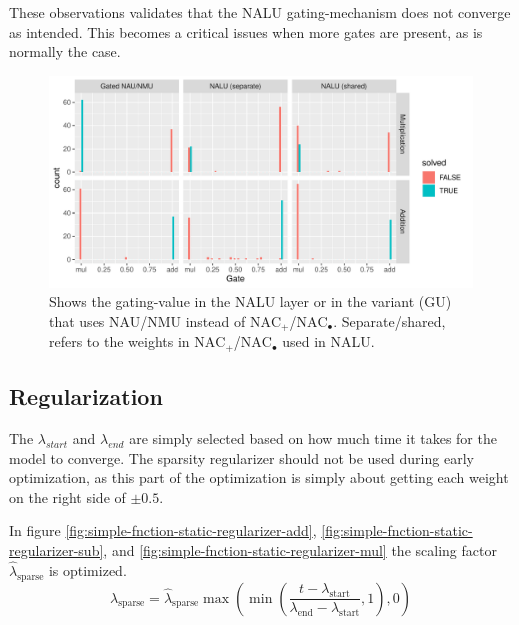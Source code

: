 These observations validates that the NALU gating-mechanism does not converge as intended. This becomes a critical issues when more gates are present, as is normally the case.

\begin{figure}[h]
\centering
\includegraphics[width=0.98\linewidth]{results/function_task_static_nalu.pdf}
\caption{Shows the gating-value in the NALU layer or in the variant (GU) that uses NAU/NMU instead of $\mathrm{NAC}_{+}$/$\mathrm{NAC}_{\bullet}$. Separate/shared, refers to the weights in $\mathrm{NAC}_{+}$/$\mathrm{NAC}_{\bullet}$ used in NALU.}
\label{fig:simple-function-static-nalu-gate-graph}
\end{figure}



\subsection{Regularization}
\label{sec:appendix:simple-function-task:regualization}

The $\lambda_{start}$ and $\lambda_{end}$ are simply selected based on how much time it takes for the model to converge. The sparsity regularizer should not be used during early optimization, as this part of the optimization is simply about getting each weight on the right side of $\pm 0.5$.

In figure \ref{fig:simple-fnction-static-regularizer-add}, \ref{fig:simple-fnction-static-regularizer-sub}, and \ref{fig:simple-fnction-static-regularizer-mul} the scaling factor $\hat{\lambda}_{\mathrm{sparse}}$ is optimized.
\begin{equation}
\lambda_{\mathrm{sparse}} = \hat{\lambda}_{\mathrm{sparse}} \max(\min(\frac{t - \lambda_{\mathrm{start}}}{\lambda_{\mathrm{end}} - \lambda_{\mathrm{start}}}, 1), 0)
\end{equation}

